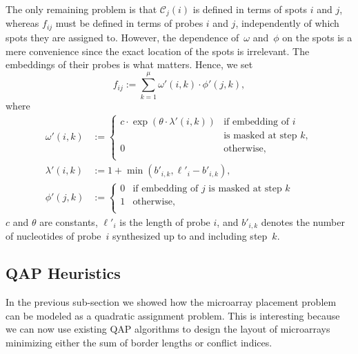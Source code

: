 \documentclass{bioinfo}
\begin{document}
The only remaining problem is that $\mathcal{C}_j(i)$ is defined in terms of spots $i$ and $j$, whereas $f_{ij}$ must be defined in terms of probes $i$ and $j$, independently of which spots they are assigned to. However, the dependence of~$\omega$ and~$\phi$ on the spots is a mere convenience since the exact location of the spots is irrelevant. The embeddings of their probes is what matters. Hence, we set
\begin{equation}
f_{ij} := \sum_{k=1}^{\mu} \omega'(i,k) \cdot \phi'(j,k),
\end{equation}
where
\begin{align}
\omega'(i,k) &:=
        \left\{
                \begin{array}{ll}
                        c \cdot \exp{\left(\theta \cdot \lambda'(i,k)\right)} &
                            \mbox{if embedding of $i$} \\
                          & \mbox{is masked at step $k$}, \\
                        0 & \mbox{otherwise}, \\
                \end{array}
        \right. \\
\lambda'(i,k) &:= 1 + \min(b'_{i,k},\ell'_{i} - b'_{i,k}), \\
\phi'(j,k) &:=
        \left\{
                \begin{array}{ll}
                        0 & \mbox{if embedding of $j$ is masked at step $k$} \\
                        1 & \mbox{otherwise}, \\
                \end{array}
        \right.
\end{align}
$c$ and $\theta$ are constants, $\ell'_i$ is the length of probe $i$, and $b'_{i,k}$ denotes the number of nucleotides of probe~$i$ synthesized up to and including step~$k$.

\subsection{QAP Heuristics}

In the previous sub-section we showed how the microarray placement problem can be modeled as a quadratic assignment problem. This is interesting because we can now use existing QAP algorithms to design the layout of microarrays minimizing either the sum of border lengths or conflict indices. 
\end{document}
